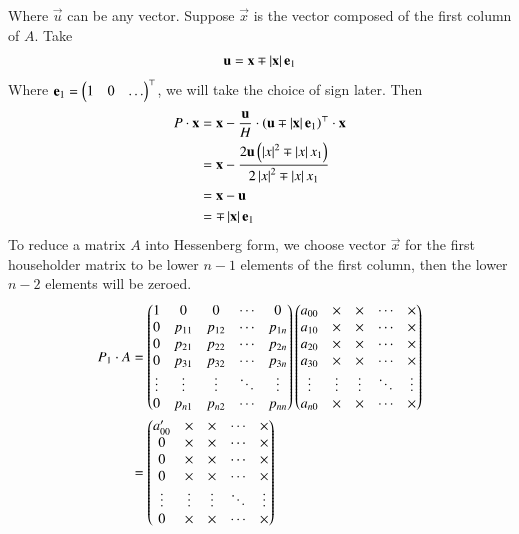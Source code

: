 \documentclass[journal]{IEEEtran}
\begin{document}
Where $\vec{u}$ can be any vector. Suppose $\vec{x}$ is the vector composed of the first column of $A$. Take
\begin{align}
	\mathbf{u} = \mathbf{x} \mp \left\vert\mathbf{x}\right\vert\mathbf{e}_1
\end{align}
Where $\mathbf{e}_1 = \begin{pmatrix}1 & 0 & \dots\end{pmatrix}^\top$, we will take the choice of sign later. Then
\begin{align}
	P\cdot\mathbf{x} &= \mathbf{x} - \frac{\mathbf{u}}{H}\cdot\left(\mathbf{u}\mp \left\vert\mathbf{x}\right\vert\mathbf{e}_1\right)^\top\cdot \mathbf{x}\\
	              &= \mathbf{x} - \frac{2\mathbf{u}\left(\left\vert x\right\vert^2\mp \left\vert x\right\vert x_1\right)}{2\left\vert x\right\vert^2\mp \left\vert x\right\vert x_1}\\
	              &= \mathbf{x} - \mathbf{u}\\
	              &= \mp\left\vert\mathbf{x}\right\vert\mathbf{e}_1
\end{align}
To reduce a matrix $A$ into Hessenberg form, we choose vector $\vec{x}$ for the first householder matrix to be lower $n-1$ elements of the first column, then the lower $n-2$ elements will be zeroed.
\begin{align}
P_1\cdot A &= \begin{pmatrix}
1 & 0 & 0 & \cdots & 0 \\
0 & p_{11} & p_{12} & \cdots & p_{1n} \\
0      & p_{21} & p_{22} & \cdots & p_{2n} \\
0      & p_{31} & p_{32} & \cdots & p_{3n} \\
\vdots & \vdots & \vdots & \ddots & \vdots \\
0      & p_{n1} & p_{n2} & \cdots & p_{nn}
\end{pmatrix}\begin{pmatrix}
a_{00} & \times & \times & \cdots & \times \\
a_{10} & \times & \times & \cdots & \times \\
a_{20} & \times & \times & \cdots & \times \\
a_{30} & \times & \times & \cdots & \times \\
\vdots & \vdots & \vdots & \ddots & \vdots \\
a_{n0} & \times & \times & \cdots & \times
\end{pmatrix}\\
&=\begin{pmatrix}
a_{00}^\prime & \times & \times & \cdots & \times \\
0 & \times & \times & \cdots & \times \\
0      & \times & \times & \cdots & \times \\
0      & \times   & \times & \cdots & \times \\
\vdots & \vdots & \vdots & \ddots & \vdots \\
0      & \times      & \times      & \cdots & \times
\end{pmatrix}
\end{align}
\end{document}
